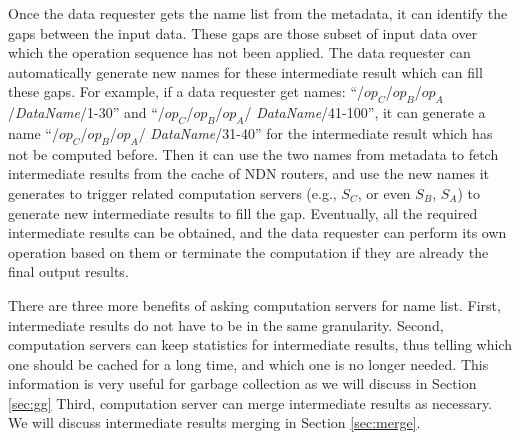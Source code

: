 Once the data requester gets the name list from the metadata, it can identify
the gaps between the input data.  These gaps are those subset of input data over
which the operation sequence has not been applied.  The data requester can
automatically generate new names for these intermediate result which can fill
these gaps. For example, if a data requester get names:
``/$op_C$/$op_B$/$op_A$/{\it DataName}/1-30'' and ``/$op_C$/$op_B$/$op_A$/{\it
  DataName}/41-100'', it can generate a name ``/$op_C$/$op_B$/$op_A$/{\it
  DataName}/31-40'' for the intermediate result which has not be computed
before.  Then it can use the two names from metadata to fetch intermediate
results from the cache of NDN routers, and use the new names it generates to
trigger related computation servers (e.g., $S_C$, or even $S_B$, $S_A$) to
generate new intermediate results to fill the gap.  Eventually, all the required
intermediate results can be obtained, and the data requester can perform its own
operation based on them or terminate the computation if they are already the
final output results.

There are three more benefits of asking computation servers for name list.  First,
intermediate results do not have to be in the same granularity.  Second,
computation servers can keep statistics for intermediate results, thus telling
which one should be cached for a long time, and which one is no longer needed. This
information is very useful for garbage collection as we will discuss in Section
\ref{sec:gg} Third, computation server can merge intermediate results
as necessary. We will discuss intermediate results merging in Section \ref{sec:merge}.
